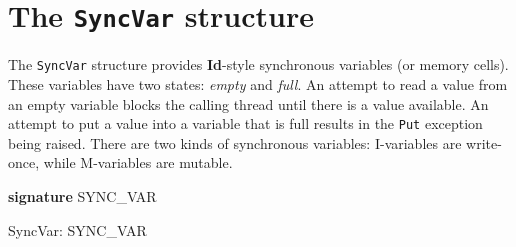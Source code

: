 \section{The {\tt Sync\-Var} structure}


The \texttt{Sync\-Var} structure provides \textbf{Id}-style synchronous variables (or memory cells).\- These variables have two states: \textit{empty} and \textit{full}.\- An attempt to read a value from an empty variable blocks the calling thread until there is a value available.\- An attempt to put a value into a variable that is full results in the \texttt{Put} exception being raised.\- There are two kinds of synchronous variables: I-variables are write-once, while M-variables are mutable.\- 
\begin{synopsis}
\item {\textbf{signature}} SYNC\_\linebreak[0]VAR\label{sig-SYNC_VAR}
\item {\STRUCTURE} SyncVar: SYNC\_\linebreak[0]VAR\label{str-SyncVar}
\end{synopsis}


